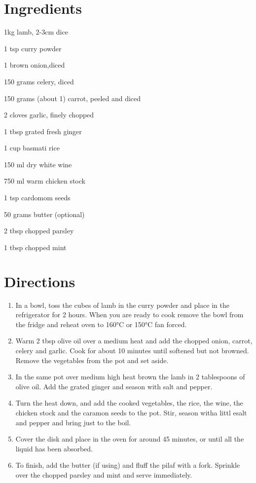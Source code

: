 
\section*{Ingredients}
\bigskip
\begin{ingredients-list}
	\item 1kg lamb, 2-3cm dice
	\item 1 tsp curry powder
	\item 1 brown onion,diced
	\item 150 grams celery, diced
 	\item 150 grams (about 1) carrot, peeled and diced
	\item 2 cloves garlic, finely chopped
	\item 1 tbsp grated fresh ginger
	\item 1 cup basmati rice
	\item 150 ml dry white wine
	\item 750 ml warm chicken stock
	\item 1 tsp cardomom seeds
	\item 50 grams butter (optional)
	\item 2 tbsp chopped parsley
	\item 1 tbsp chopped mint
\end{ingredients-list}

\section*{Directions}
\begin{enumerate}
	\item  In a bowl, toss the cubes of lamb in the curry powder and place in the refrigerator for 2 hours.
		When you are ready to cook remove the bowl from the fridge and reheat oven to 160°C or 150°C fan forced.
	\item Warm 2 tbsp olive oil over a medium heat and add the chopped onion, carrot, celery and garlic.  Cook for about 10 minutes until softened but not browned.
		Remove the vegetables from the pot and set aside.
	\item In the same pot over medium high heat brown the lamb in 2 tablespoons of olive oil. Add the grated ginger and season with salt and pepper.
	\item Turn the heat down, and add the cooked vegetables, the rice, the wine, the chicken stock and the caramon seeds to the  pot. Stir, season witha littl esalt and pepper and bring just to the 					boil.
	\item Cover the disk and place in the oven for around 45 minutes, or until all the liquid has been absorbed.
	\item To finish, add the butter (if using) and fluff the pilaf with a fork. Sprinkle over the chopped parsley and mint and serve immediately.
\end{enumerate}

